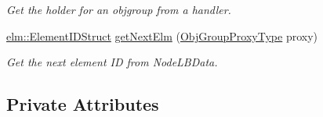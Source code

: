 \begin{DoxyCompactItemize}
\begin{DoxyCompactList}\small\item\em Get the holder for an objgroup from a handler. \end{DoxyCompactList}\item 
\hyperlink{structvt_1_1elm_1_1_element_i_d_struct}{elm\+::\+Element\+I\+D\+Struct} \hyperlink{structvt_1_1objgroup_1_1_obj_group_manager_a0ebea4ad5b94becdeefe688d75f78142}{get\+Next\+Elm} (\hyperlink{namespacevt_ad7cae989df485fccca57f0792a880a8e}{Obj\+Group\+Proxy\+Type} proxy)
\begin{DoxyCompactList}\small\item\em Get the next element ID from {\ttfamily Node\+L\+B\+Data}. \end{DoxyCompactList}\end{DoxyCompactItemize}
\subsection*{Private Attributes}
